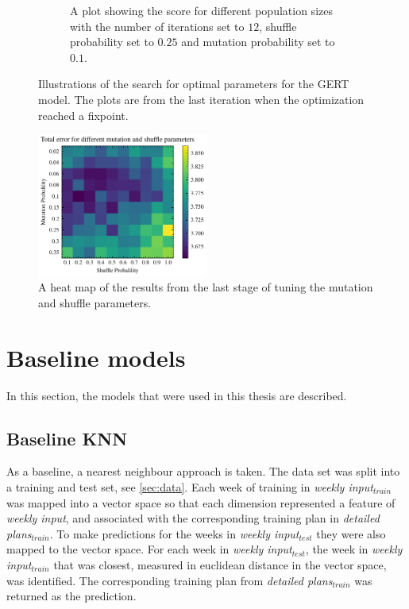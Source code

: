 \begin{figure}[t!]
\begin{subfigure}[t]{0.45\textwidth}
        \captionsetup{width=.9\linewidth}
        \caption{A plot showing the score for different population sizes with the number of iterations set to $12$, shuffle probability set to $0.25$ and mutation probability set to $0.1$.}
    \end{subfigure}
    \caption{Illustrations of the search for optimal parameters for the GERT model. The plots are from the last iteration when the optimization reached a fixpoint.}
    \label{fig:param_search_cv_population}
\end{figure}

\begin{figure}[ht]
    \centering
    \includegraphics[width=0.5\textwidth]{chapters/figures/shuffle_mutation.pdf}
    \caption{A heat map of the results from the last stage of tuning the mutation and shuffle parameters.}
    \label{fig:mutation_shuffle}
\end{figure}

\section{Baseline models}
In this section, the models that were used in this thesis are described.

\subsection{Baseline KNN}
\label{sec:BKNN}
As a baseline, a nearest neighbour approach is taken.
The data set was split into a training and test set, see \cref{sec:data}.
Each week of training in \textit{weekly input}$_{train}$ was mapped into a vector space so that each dimension represented a feature of \textit{weekly input}, and associated with the corresponding training plan in \textit{detailed plans}$_{train}$.
To make predictions for the weeks in \textit{weekly input}$_{test}$ they were also mapped to the vector space.
For each week in \textit{weekly input}$_{test}$, the week in \textit{weekly input}$_{train}$ that was closest, measured in euclidean distance in the vector space, was identified. The corresponding training plan from \textit{detailed plans}$_{train}$ was returned as the prediction.

